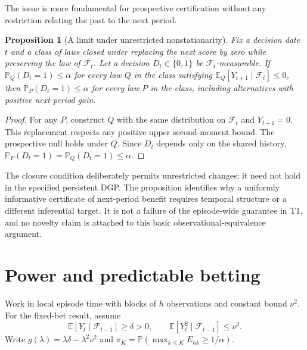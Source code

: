 \documentclass[11pt,a4paper]{article}
\newtheorem{proposition}[theorem]{Proposition}
\theoremstyle{remark}\newtheorem{remark}[theorem]{Remark}
\newcommand{\E}{\mathbb E}\newcommand{\Prb}{\mathbb P}
\newcommand{\F}{\mathcal F}\newcommand{\G}{\mathcal G}\newcommand{\W}{\mathcal W}
\begin{document}
The issue is more fundamental for prospective certification without any
restriction relating the past to the next period.
\begin{proposition}[A limit under unrestricted nonstationarity]
Fix a decision date $t$ and a class of laws closed under replacing the next
score by zero while preserving the law of $\F_t$. Let a decision
$D_t\in\{0,1\}$ be $\F_t$-measurable. If
$\Prb_Q(D_t=1)\le\alpha$ for every law $Q$ in the class satisfying
$\E_Q[Y_{t+1}\mid\F_t]\le0$, then
$\Prb_P(D_t=1)\le\alpha$ for every law $P$ in the class, including
alternatives with positive next-period gain.
\end{proposition}
\begin{proof}
For any $P$, construct $Q$ with the same distribution on $\F_t$ and
$Y_{t+1}=0$. This replacement respects any positive upper second-moment bound.
The prospective null holds under $Q$. Since $D_t$ depends only on the shared
history, $\Prb_P(D_t=1)=\Prb_Q(D_t=1)\le\alpha$.
\end{proof}
The closure condition deliberately permits unrestricted changes; it need not
hold in the specified persistent DGP. The proposition identifies why a
uniformly informative certificate of next-period benefit requires temporal
structure or a different inferential target. It is not a failure of the
episode-wide guarantee in T1, and no novelty claim is attached to this basic
observational-equivalence argument.

\section{Power and predictable betting}
Work in local episode time with blocks of $h$ observations and constant bound
$\nu^2$. For the fixed-bet result, assume
\begin{equation}
 \E[Y_t\mid\F_{t-1}]\ge\delta>0,\qquad
 \E[Y_t^2\mid\F_{t-1}]\le\nu^2.\label{eq:alt}
\end{equation}
Write $g(\lambda)=\lambda\delta-\lambda^2\nu^2$ and
$\pi_K=\Prb(\max_{k\le K}E_{hk}\ge1/\alpha)$.
\end{document}
